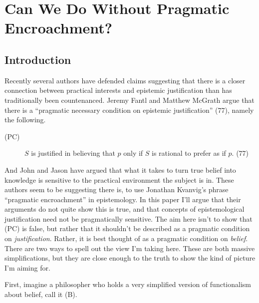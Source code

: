%
%
%
%
%
%
%
%
%
%
\chapter{Can We Do Without Pragmatic Encroachment?}


\section{Introduction}

Recently several authors have defended claims suggesting that there is a closer connection between practical interests and epistemic justification than has traditionally been countenanced. Jeremy Fantl and Matthew McGrath \citeyear{Fantl2002} argue that there is a ``pragmatic necessary condition on epistemic justification'' (77), namely the following.

\begin{description}
\item[(PC)] \(S\) is justified in believing that \(p\) only if \(S\) is rational to prefer as if \(p\). (77)
\end{description}

\noindent And John \citet{Hawthorne2004} and Jason \citet{Stanley2005-STAKAP} have argued that what it takes to turn true belief into knowledge is sensitive to the practical environment the subject is in. These authors seem to be suggesting there is, to use Jonathan Kvanvig's phrase ``pragmatic encroachment'' in epistemology. In this paper I'll argue that their arguments do not quite show this is true, and that concepts of epistemological justification need not be pragmatically sensitive. The aim here isn't to show that (PC) is false, but rather that it shouldn't be described as a pragmatic condition on \textit{justification}. Rather, it is best thought of as a pragmatic condition on \textit{belief}. There are two ways to spell out the view I'm taking here. These are both massive simplifications, but they are close enough to the truth to show the kind of picture I'm aiming for.

First, imagine a philosopher who holds a very simplified version of functionalism about belief, call it (B).


